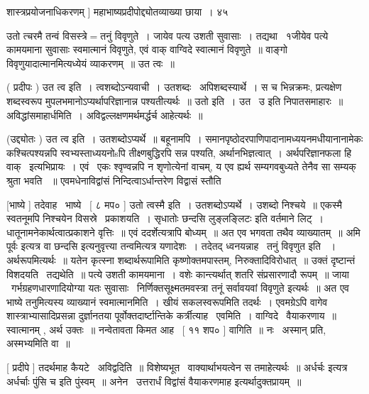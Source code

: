 \documentclass[11pt, openany]{book}
\begin{document}
शास्त्रप्रयोजनाधिकरणम् ] महाभाष्यप्रदीपोद्द्योतव्याख्या छाया~। ४५ 



 उतो त्चरमै तन्वं विसस्त्रे$=$तनुं विवृणुते~। जायेव पत्य उशती सुवासाः~। 
तद्यथा \textendash\ १जीयेव पत्ये कामयमाना सुवासाः स्वमात्मानं विवृणुते, एवं वाक्
वाग्विदे स्वात्मानं विवृणुते~॥ वाङ्गो विवृणुयादात्मानमित्यध्येयं
व्याकरणम्~॥ उत त्वः~॥ 

 ( प्रदीपः ) उत त्व इति~। त्वशब्दोऽन्यवाची~। 
उतशब्दः \textendash\ अपिशब्दस्यार्थे~। स च भिन्नक्रमः, प्रत्यक्षेण शब्दस्वरूप
मुपलभमानोऽप्यर्थापरिज्ञानान्न पश्यतीत्यर्थः~॥ उतो इति~। {\qt उत \textendash\ उ} इति
निपातसमाहारः~॥ अविद्धांसमाहार्धमिति~। अविद्वल्लक्षणमर्थमर्द्धर्च
आहेत्यर्थः~॥ 

 (उद्द्योतः ) उत त्व इति~। {\qt उतशब्दोऽप्यर्थे~॥ बहूनामपि~।}
समानपृष्ठोदरपाणिपादानामध्ययनमधीयानानामेकः कश्चित्पश्यन्नपि
स्वभ्यस्ताध्ययनोsपि तीक्ष्णबुद्धिरपि सन्न पश्यति, अर्थानभिज्ञत्वात्~। 
अर्थपरिज्ञानफला हि वाक् \textendash\ इत्यभिप्रायः~। एवं \textendash\ एकः श्वृण्वन्नपि न
शृणोत्येनां वाचम्, य एव ह्यर्थ सम्यगवबुध्यते तेनैव सा सम्यक् श्रुता भवति
~॥ एवमधेनाविद्वांसं निन्दित्वाऽर्धान्तरेण विद्वासं स्तौति \textendash\ 



 [भाष्ये ] तदेवाह \textendash\ भाष्ये \textendash\ [ ८ मप० ] उतो त्वस्मै इति~। 
उतशब्दोऽप्यर्थे~। उशब्दो निश्चये~॥ एकस्मै स्वतनूमपि निश्चयेन
विसस्रे \textendash\ प्रकाशयति~। सृधातोः {\qt छन्दसि लुङ्लङ्लिटः इति वर्तमाने लिट्~।} 
धातूनामनेकार्थत्वात्प्रकाशने वृत्तिः~॥ एवं ददर्शेत्यत्रापि बोध्यम्~॥
अत एव भगवता तथैव व्याख्यातम्~॥ {\qt अमि पूर्वः} इत्यत्र {\qt वा छन्दसि}
इत्यनुवृत्त्या तन्वमित्यत्र यणादेशः~। तदेतद् ध्वनयन्नाह \textendash\ तनुं विवृणुत इति
~। अर्थरूपमित्यर्थः~॥ यतेन कृत्स्ना शब्दार्थरूपामिति कृष्णोक्तमपास्तम्,
निरुक्तादिविरोधात्~॥ उक्तं दृष्टान्तं विशदयति \textendash\ तद्यथेति~॥ पत्ये उशती
कामयमाना~। वशेः कान्त्यर्थात् शतरि संप्रसारणादौ रूपम्~॥
जाया \textendash\ गर्भग्रहणधारणादियोग्या यतः सुवासाः \textendash\ निर्णिक्तसूक्ष्मतमवस्त्रा तनूं
सर्वावयवां विवृणुते इत्यर्थः~॥ अत एव भाष्ये तनुमित्यस्य व्याख्यानं
स्वमात्मानमिति~। खीयं सकलस्वरूपमिति तदर्थः~। एवमग्रेऽपि वागेव
शास्त्राभ्यासादिप्रसन्ना दुर्ज्ञानतया पूर्वोक्तदार्ष्टान्तिके
कर्त्रीत्याह \textendash\ एवमिति~। वाग्विदे \textendash\ वैयाकरणाय~॥ स्वात्मानम् , अर्थ उक्तः~॥
नन्वेतावता किमत आह \textendash\ [ ११ शप० ] वागिति~॥ नः \textendash\ अस्मान् प्रति,
अस्मभ्यमिति वा~॥ 

 [ प्रदीपे ] तदर्थमाह कैयटे \textendash\ अविद्वदिति~॥ विशेष्यभूत \textendash\ 
वाक्यार्थाभयत्वेन स तमाहेत्यर्थः~॥ {\qt अर्धर्चः} इत्यत्र {\qt अर्धर्चाः पुंसि
च} इति पुंस्वम्~॥ अनेन \textendash\ {\qt उत्तरार्धं विद्वांसं वैयाकरणमाह}
इत्यर्थादुक्तप्रायम्~॥ 
\end{document}
